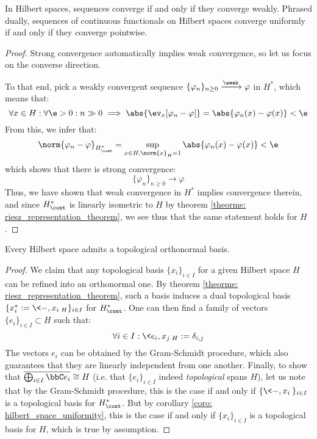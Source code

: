         \begin{corollary} \label{coro: hilbert_space_uniformity}
            In Hilbert spaces, sequences converge if and only if they converge weakly. Phrased dually, sequences of continuous functionals on Hilbert spaces converge uniformly if and only if they converge pointwise.
        \end{corollary}
            \begin{proof}
                Strong convergence automatically implies weak convergence, so let us focus on the converse direction.
            
                To that end, pick a weakly convergent sequence $\{\varphi_n\}_{n \geq 0} \xrightarrow[]{\weak} \varphi$ in $H^*$, which means that:
                    $$\forall x \in H: \forall \e > 0: n \gg 0 \implies \abs{\ev_x[\varphi_n - \varphi]} = \abs{\varphi_n(x) - \varphi(x)} < \e$$
                From this, we infer that:
                    $$\norm{ \varphi_n - \varphi }_{H^*_{\cont}} = \sup_{x \in H, \norm{x}_H = 1} \abs{\varphi_n(x) - \varphi(x)} < \e$$
                which shows that there is strong convergence:
                    $$\{\varphi_n\}_{n \geq 0} \to \varphi$$
                Thus, we have shown that weak convergence in $H^*$ implies convergence therein, and since $H^*_{\cont}$ is linearly isometric to $H$ by theorem \ref{theorme: riesz_representation_theorem}, we see thus that the same statement holds for $H$.
            \end{proof}
        \begin{definition}
            
        \end{definition}
        \begin{corollary} \label{coro: orthonormal_bases_for_hilbert_spaces}
            Every Hilbert space admits a topological orthonormal basis.
        \end{corollary}
            \begin{proof}
                We claim that any topological basis $\{x_i\}_{i \in I}$ for a given Hilbert space $H$ can be refined into an orthonormal one. By theorem \ref{theorme: riesz_representation_theorem}, such a basis induces a dual topological basis $\{x_i^* := \<-, x_i\>_H\}_{i \in I}$ for $H^*_{\cont}$. One can then find a family of vectors $\{e_i\}_{i \in I} \subset H$ such that:
                    $$\forall i \in I: \<e_i, x_j\>_H := \delta_{i, j}$$
                The vectors $e_i$ can be obtained by the Gram-Schmidt procedure, which also guarantees that they are linearly independent from one another. Finally, to show that $\overline{\bigoplus_{i \in I} \bbC e_i} \cong H$ (i.e. that $\{e_i\}_{i \in I}$ indeed \textit{topological} spans $H$), let us note that by the Gram-Schmidt procedure, this is the case if and only if $\{\<-, x_i\>\}_{i \in I}$ is a topological basis for $H^*_{\cont}$. But by corollary \ref{coro: hilbert_space_uniformity}, this is the case if and only if $\{x_i\}_{i \in I}$ is a topological basis for $H$, which is true by assumption.
            \end{proof}

